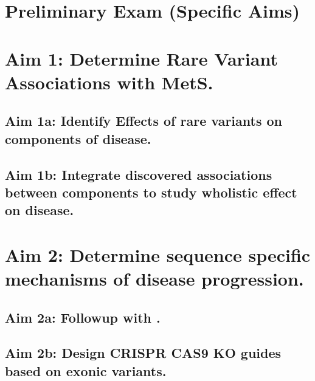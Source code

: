\documentclass{article}
\begin{document}
\section*{Preliminary Exam (Specific Aims)}



\section*{Aim 1: Determine Rare Variant Associations with MetS.}

\subsection*{Aim 1a: Identify Effects of rare variants on components of disease.}

\subsection*{Aim 1b: Integrate discovered associations between components to study wholistic effect on disease.}

\section*{Aim 2: Determine sequence specific mechanisms of disease progression.}

\subsection*{Aim 2a: Followup with .}

\subsection*{Aim 2b: Design CRISPR CAS9 KO guides based on exonic variants.}
\end{document}
